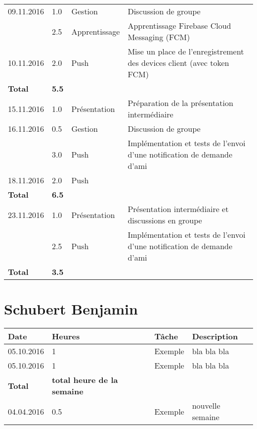 \documentclass[french]{article}
\begin{document}
\begin{longtable}{p{}|p{}|p{}|p{}}
		\hline
		09.11.2016 & 1.0 & Gestion & Discussion de groupe \\
		           & 2.5 & Apprentissage & Apprentissage Firebase Cloud Messaging (FCM) \\
		10.11.2016 & 2.0 & Push & Mise un place de l'enregistrement des devices client (avec token FCM) \\
		\textbf{Total} & \textbf{5.5} && \\
		
		\hline
		15.11.2016 & 1.0 & Présentation & Préparation de la présentation intermédiaire \\
		16.11.2016 & 0.5 & Gestion & Discussion de groupe \\
				   & 3.0 & Push & Implémentation et tests de l'envoi d'une notification de demande d'ami \\
		18.11.2016 & 2.0 & Push & \\
		\textbf{Total} & \textbf{6.5} && \\
		
		\hline
		23.11.2016 & 1.0 & Présentation & Présentation intermédiaire et discussions en groupe \\
		           & 2.5 & Push & Implémentation et tests de l'envoi d'une notification de demande d'ami \\

		\textbf{Total} & \textbf{3.5} && \\
		
		\hline
	\end{longtable}
	
	\section*{Schubert Benjamin}
	\begin{longtable}{p{}|p{}|p{}|p{}}
		Date&Heures&Tâche&Description\\
		\hline \hline
		05.10.2016 & 1 & Exemple & bla bla bla\\
		05.10.2016 & 1 & Exemple & bla bla bla\\
		\textbf{Total} & \textbf{total heure de la semaine} &&\\
		\hline
		04.04.2016 & 0.5 & Exemple & nouvelle semaine \\
	\end{longtable}
	
\end{document}
